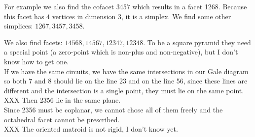 \documentclass[paper=a4, fontsize=11pt]{scrartcl} %
\theoremstyle{plain}
\begin{document}
For example we also find the cofacet 3457 which results in a facet 1268. Because this facet has $4$ vertices in dimension $3$, it is a simplex. We find some other simplices: $1267,3457,3458$.

We also find facets: $14568,14567,12347,12348$. To be a square pyramid they need a special point (a zero-point which is non-plus and non-negative), but I don't know how to get one.\\

If we have the same circuits, we have the same intersections in our Gale diagram so both 7 and 8 should lie on the line 23 and on the line 56, since these lines are different and the intersection is a single point, they must lie on the same point.\\

XXX Then 2356 lie in the same plane.\\

Since 2356 must be coplanar, we cannot chose all of them freely and the octahedral facet cannot be prescribed.\\

XXX The oriented matroid is not rigid, I don't know yet.
\end{document}
